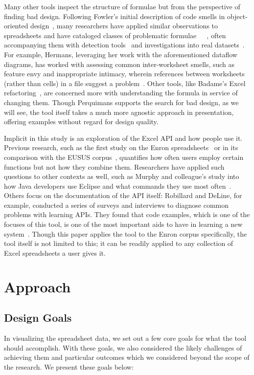 \documentclass[conference]{IEEEtran}
\newcommand{\toolname}{Perquimans\xspace} \newcommand{\toolnameend}{Perquimans}
\begin{document}
	Many other tools inspect the structure of formulae but from the
	perspective of finding bad design.  Following Fowler's initial description of
	code smells in object-oriented design~\cite{fowler2009refactoring}, many
	researchers have applied similar observations to spreadsheets and have
	cataloged classes of problematic
	formulae~\cite{hermans2012detecting}~\cite{cunha2012towards}~\cite{asavametha2012detecting}, often accompanying them with detection tools~\cite{abreu2014smelling} and investigations into real datasets~\cite{jansen2015code}. For example, Hermans, leveraging her work with the aforementioned dataflow diagrams, has worked with assessing common inter-worksheet smells, such as feature envy and inappropriate intimacy, wherein references between worksheets (rather than cells) in a file suggest a problem~\cite{hermans2012detectinginter}. Other tools, like Badame's Excel refactoring~\cite{badame2012refactoring}, are concerned more with understanding the formula in service of changing them. Though \toolname supports the search for bad design, as we will see, the tool itself takes a much more agnostic approach in presentation, offering examples without regard for design quality.

	Implicit in this study is an exploration of the Excel API and how people use
	it. Previous research, such as the first study on the Enron
	spreadsheets~\cite{hermans2015enron} or in its comparison with the EUSUS
	corpus~\cite{jansen2015enron}, quantifies how often users employ certain
	functions but not how they combine them. Researchers have applied such
	questions to other contexts as well, such as Murphy and colleague's study into
	how Java developers use Eclipse and what commands they use most
	often~\cite{murphy2006java}. Others focus on the documentation of the API
	itself: Robillard and DeLine, for example, conducted a series of surveys and
	interviews to diagnose common problems with learning APIs. They found that
	code examples, which is one of the focuses of this tool, is one of the most important
	aids to have in learning a new system~\cite{robillard2011field}. Though this
	paper applies the tool to the Enron corpus specifically, the tool itself is not
	limited to this; it can be readily applied to any collection of Excel
	spreadsheets a user gives it.
	
	\section{Approach}
	
	\subsection{Design Goals} \label{goals} In visualizing the spreadsheet data, we
	set out a few core goals for what the tool should accomplish. With
	these goals, we also considered the likely challenges of achieving them
	and particular outcomes which we considered beyond the scope of the research.
	We present these goals below:
	
\end{document}
